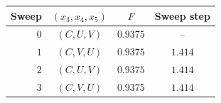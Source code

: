 \begin{tabular}{rccc}
\toprule
Sweep & $(x_3,x_4,x_5)$ & $F$ & Sweep step \\
\midrule
$0$ & $(C,U,V)$ & $0.9375$ & -- \\
$1$ & $(C,V,U)$ & $0.9375$ & $1.414$ \\
$2$ & $(C,U,V)$ & $0.9375$ & $1.414$ \\
$3$ & $(C,V,U)$ & $0.9375$ & $1.414$ \\
\bottomrule
\end{tabular}
